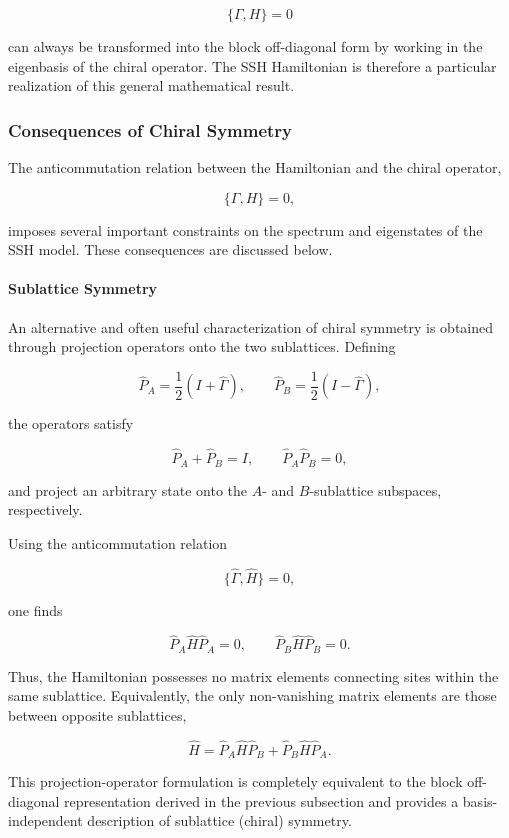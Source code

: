 \documentclass[11pt, a4paper]{article}
\begin{document}
\[
\{\Gamma,H\}=0
\]

can always be transformed into the block off-diagonal form by working in the
eigenbasis of the chiral operator. The SSH Hamiltonian is therefore a
particular realization of this general mathematical result.



\subsubsection{Consequences of Chiral Symmetry}
The anticommutation relation between the Hamiltonian and the chiral operator,

\[
\{\Gamma,H\}=0,
\]

imposes several important constraints on the spectrum and eigenstates of the SSH model. These consequences are discussed below.

\paragraph{Sublattice Symmetry}

An alternative and often useful characterization of chiral symmetry is obtained
through projection operators onto the two sublattices. Defining

\begin{equation}
\hat P_A=\frac12(I+\hat\Gamma),
\qquad
\hat P_B=\frac12(I-\hat\Gamma),
\end{equation}

the operators satisfy

\[
\hat P_A+\hat P_B=I,
\qquad
\hat P_A\hat P_B=0,
\]

and project an arbitrary state onto the \(A\)- and \(B\)-sublattice
subspaces, respectively.

Using the anticommutation relation

\[
\{\hat\Gamma,\hat H\}=0,
\]

one finds

\[
\hat P_A\hat H\hat P_A=0,
\qquad
\hat P_B\hat H\hat P_B=0.
\]

Thus, the Hamiltonian possesses no matrix elements connecting sites within the
same sublattice. Equivalently, the only non-vanishing matrix elements are those
between opposite sublattices,

\[
\hat H
=
\hat P_A\hat H\hat P_B
+
\hat P_B\hat H\hat P_A.
\]

This projection-operator formulation is completely equivalent to the block
off-diagonal representation derived in the previous subsection and provides a
basis-independent description of sublattice (chiral) symmetry.
\end{document}
